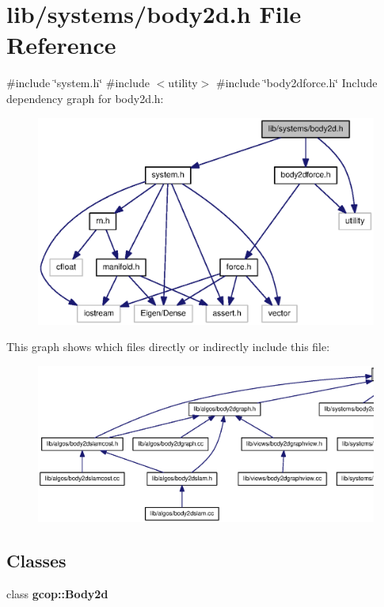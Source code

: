 \section{lib/systems/body2d.h \-File \-Reference}
\label{body2d_8h}
{\ttfamily \#include \char`\"{}system.\-h\char`\"{}}\*
{\ttfamily \#include $<$utility$>$}\*
{\ttfamily \#include \char`\"{}body2dforce.\-h\char`\"{}}\*
\-Include dependency graph for body2d.\-h\-:\nopagebreak
\begin{figure}[H]
\begin{center}
\leavevmode
\includegraphics[width=350pt]{body2d_8h__incl}
\end{center}
\end{figure}
\-This graph shows which files directly or indirectly include this file\-:\nopagebreak
\begin{figure}[H]
\begin{center}
\leavevmode
\includegraphics[width=350pt]{body2d_8h__dep__incl}
\end{center}
\end{figure}
\subsection*{\-Classes}
\begin{DoxyCompactItemize}
\item 
class {\bf gcop\-::\-Body2d}
\end{DoxyCompactItemize}
